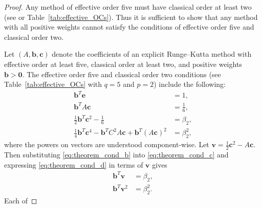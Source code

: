 \begin{proof}%
	Any method of effective order five must have classical order at least two
	(see \cite{Butcher2008_book} or Table~\ref{tab:effective_OCs}).
    Thus it is sufficient to show that any method with all positive weights
    cannot satisfy the conditions of effective order five and classical order two.

    Let $(A,\bm{b},\bm{c})$ denote the coefficients of an explicit Runge--Kutta method with
    effective order at least five, classical order at least two, and positive 
    weights $\bm{b} > \bm{0}$.
    The effective order five and classical order two conditions
    (see Table~\ref{tab:effective_OCs} with $q=5$ and $p=2$) include the following:
    \begin{subequations}\label{eq:theorem_cond}
    		\begin{align}
    			\bm{b}^T\bm{e} & = 1, \label{eq:theorem_cond_a} \\
             	\bm{b}^TA\bm{c} &= \frac{1}{6}, \label{eq:theorem_cond_b} \\
            	\frac{1}{2}\bm{b}^T\bm{c}^2 - \frac{1}{6} &= \beta_2, \label{eq:theorem_cond_c} \\
            	\frac{1}{4}\bm{b}^T\bm{c}^4 - \bm{b}^TC^2A\bm{c} + \bm{b}^T(A\bm{c})^2 &= \beta_2^2, \label{eq:theorem_cond_d}
        	\end{align}
	\end{subequations}
	where the powers on vectors are understood component-wise. 
	Let
		$\bm{v} = \frac{1}{2}\bm{c}^2 - A\bm{c}$.
	Then substituting \eqref{eq:theorem_cond_b} into \eqref{eq:theorem_cond_c} and expressing \eqref{eq:theorem_cond_d} in terms of $\bm{v}$ gives
	\begin{align*}
		\bm{b}^T\bm{v} &= \beta_2, \\%
		\bm{b}^T\bm{v}^2 &= \beta_2^2. %
	\end{align*}
  Each of %

\end{proof}
